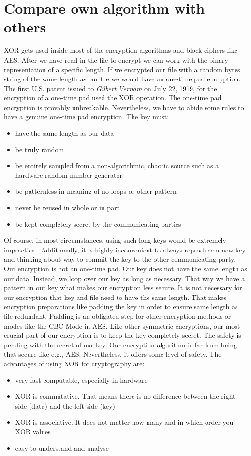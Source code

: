 \documentclass[]{article}
\begin{document}
\section{Compare own algorithm with others}
XOR gets used inside most of the encryption algorithms and block ciphers like AES. After we have read in the file to 
encrypt we can work with the binary representation of a specific length. If we encrypted our file with a random bytes 
string of the same length as our file we would have an one-time pad encryption. 
The first U.S. patent issued to \textit{Gilbert Vernam} on July 22, 1919, for the encryption of a one-time pad 
used the XOR operation. \cite{enwiki:1147326021} The one-time pad encryption is provably unbreakable. Nevertheless, we 
have to abide some rules to have a genuine one-time pad encryption. The key must: 
\begin{itemize}
    \item have the same length as our data
    \item be truly random
    \item be entirely sampled from a non-algorithmic, chaotic source such as a hardware random number generator
    \item be patternless in meaning of no loops or other pattern
    \item never be reused in whole or in part
    \item be kept completely secret by the communicating parties
\end{itemize}
Of course, in most circumstances, using such long keys would be extremely impractical. Additionally, it is highly
inconvenient to always reproduce a new key and thinking about way to commit the key to the other communicating party. 
Our encryption is not an one-time pad. Our key does not have the same length as our data. Instead, we loop over our key as 
long as necessary. That way we have a pattern in our key what makes our encryption less secure. It is not necessary for 
our encryption that key and file need to have the same length. That makes encryption preparations like padding the key in 
order to ensure same length as file redundant.
Padding is an obligated step for other encryption methods or modes like the CBC Mode in AES. 
Like other symmetric encryptions, our most crucial part of our encryption is to keep the key completely secret. The
safety is pending with the secret of our key. 
\noindent
Our encryption algorithm is far from being that secure like e.g., AES. Nevertheless, it offers some level of
safety.
\noindent
The advantages of using XOR for cryptography are:
\begin{itemize}
    \item very fast computable, especially in hardware
    \item XOR is commutative. That means there is no difference between the right side (data) and the left side (key)
    \item XOR is associative. It does not matter how many and in which order you XOR values
    \item easy to understand and analyse
\end{itemize}

\newpage  
\printbibliography
\end{document}
